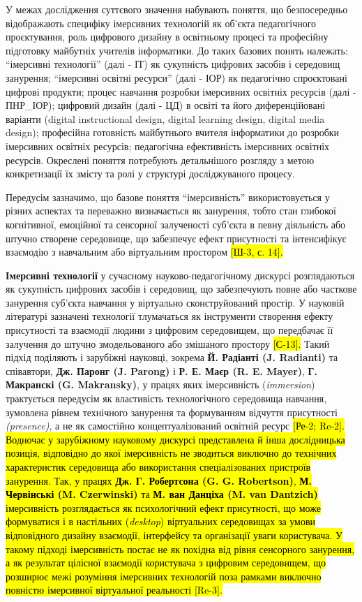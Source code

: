 У межах дослідження суттєвого значення набувають поняття, що безпосередньо відображають специфіку імерсивних технологій як об'єкта педагогічного проєктування, роль цифрового дизайну в освітньому процесі та професійну підготовку майбутніх учителів інформатики. До таких базових понять належать: ``імерсивні технології'' (далі - ІТ) як сукупність цифрових засобів і середовищ занурення; ``імерсивні освітні ресурси'' (далі - ІОР) як педагогічно спроєктовані цифрові продукти; процес навчання розробки імерсивних освітніх ресурсів (далі - ПНР\_ІОР); цифровий дизайн (далі - ЦД) в освіті та його диференційовані варіанти (digital instructional design, digital learning design, digital media design); професійна готовність майбутнього вчителя інформатики до розробки імерсивних освітніх ресурсів; педагогічна ефективність імерсивних освітніх ресурсів. Окреслені поняття потребують детальнішого розгляду з метою конкретизації їх змісту та ролі у структурі досліджуваного процесу.

Передусім зазначимо, що базове поняття ``імерсивність'' використовується у різних аспектах та переважно визначається як занурення, тобто стан глибокої когнітивної, емоційної та сенсорної залученості суб'єкта в певну діяльність або штучно створене середовище, що забезпечує ефект присутності та інтенсифікує взаємодію з навчальним або віртуальним простором \hl{{[}Ш-3, с. 14{]}.}

\textbf{Імерсивні технології} у сучасному науково-педагогічному дискурсі розглядаються як сукупність цифрових засобів і середовищ, що забезпечують повне або часткове занурення суб'єкта навчання у віртуально сконструйований простір. У науковій літературі зазначені технології тлумачаться як інструменти створення ефекту присутності та взаємодії людини з цифровим середовищем, що передбачає її залучення до штучно змодельованого або змішаного простору \hl{{[}С-13{]}.} Такий підхід поділяють і зарубіжні науковці, зокрема \textbf{Й. Радіанті (J. Radianti)} та співавтори, \textbf{Дж. Паронг (J. Parong)} і \textbf{Р. Е. Маєр (R. E. Mayer)}, \textbf{Г. Макранскі (G. Makransky)}, у працях яких імерсивність (\emph{immersion}) трактується передусім як властивість технологічного середовища навчання, зумовлена рівнем технічного занурення та формуванням відчуття присутності \emph{(presence)}, а не як самостійно концептуалізований освітній ресурс \hl{{[}Ре-2; Re-2{]}. Водночас у зарубіжному науковому дискурсі представлена й інша дослідницька позиція, відповідно до якої імерсивність не зводиться виключно до технічних характеристик середовища або використання спеціалізованих пристроїв занурення. Так, у працях \textbf{Дж. Г. Робертсона (G. G. Robertson)}, \textbf{М. Червінські (M. Czerwinski)} та \textbf{М. ван Данціха (M. van Dantzich)} імерсивність розглядається як психологічний ефект присутності, що може формуватися і в настільних (\emph{desktop}) віртуальних середовищах за умови відповідного дизайну взаємодії, інтерфейсу та організації уваги користувача. У такому підході імерсивність постає не як похідна від рівня сенсорного занурення, а як результат цілісної взаємодії користувача з цифровим середовищем, що розширює межі розуміння імерсивних технологій поза рамками виключно повністю імерсивної віртуальної реальності {[}Re-3{]}.}

